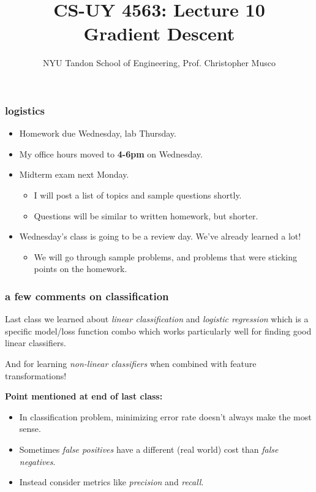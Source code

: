 \documentclass[handout,compress]{beamer}
\title{CS-UY 4563: Lecture 10 \\ Gradient Descent}
\author{NYU Tandon School of Engineering, Prof. Christopher Musco}
\date{}
\begin{document}
\begin{frame}
	\titlepage 
\end{frame}

\begin{frame}
	\frametitle{logistics}
	\begin{itemize}
		\item Homework due Wednesday, lab Thursday. 
		\item My office hours moved to \textbf{4-6pm} on Wednesday. 
		\item Midterm exam next Monday.
		\begin{itemize}
			\item I will post a list of topics and sample questions shortly.
			\item Questions will be similar to written homework, but shorter. 
		\end{itemize}
		\item Wednesday's class is going to be a review day. We've already learned a lot!
		\begin{itemize}
			\item We will go through sample problems, and problems that were sticking points on the homework. 
		\end{itemize}
	\end{itemize}
	
\end{frame}

\begin{frame}
	\frametitle{a few comments on classification}
	Last class we learned about \emph{linear classification} and \emph{logistic regression} which is a specific model/loss function combo which works particularly well for finding good linear classifiers.
	
	And for learning \emph{non-linear classifiers} when combined with feature transformations!
	
	\vspace{1em}
	\textbf{Point mentioned at end of last class:}
	\begin{itemize}
		\item In classification problem, minimizing error rate doesn't always make the most sense. 
		\item Sometimes \emph{false positives} have a different (real world) cost than \emph{false negatives}. 
		\item Instead consider metrics like \emph{precision} and \emph{recall}.
	\end{itemize}
\end{frame}
\end{document}
